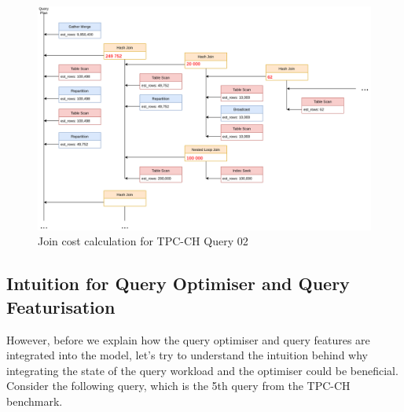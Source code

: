 \begin{figure}[ht]
  \centering
  \includegraphics[width=\linewidth]{figures/query_02_plan_02.png}
  \caption{Join cost calculation for TPC-CH Query 02}
  \label{fig:join-cost-calculation}
\end{figure}


\subsection{Intuition for Query Optimiser and Query Featurisation}
However, before we explain how the query optimiser and query features are integrated into the model, let's try to understand the intuition behind why integrating the state of the query workload and the optimiser could be beneficial. Consider the following query, which is the 5th query from the TPC-CH benchmark.


